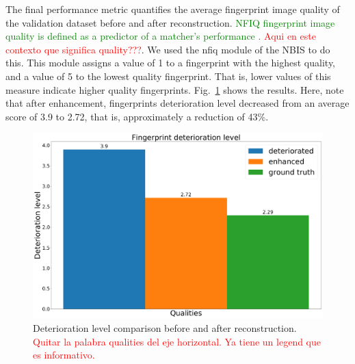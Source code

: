 \documentclass[a4paper,fleqn]{cas-dc}
\begin{document}
The final performance metric quantifies the average fingerprint image quality of the validation dataset before and after reconstruction. \textcolor{green}{NFIQ fingerprint image quality is defined as a predictor of a matcher’s performance \cite{Tabassi2009}.} \textcolor{red}{Aqui en este contexto que significa quality???}. We used the nfiq module of the NBIS to do this. This module assigns a value of 1 to a fingerprint with the highest quality, and a value of 5 to the lowest quality fingerprint. That is, lower values of this measure indicate higher quality fingerprints.  Fig.~\ref{fig11} shows the results. Here, note that after enhancement, fingerprints deterioration level decreased from an average score of 3.9 to 2.72, that is, approximately a reduction of 43\%.
\begin{figure}[htbp]
\centerline{\includegraphics[scale=0.13]{figs/mean_qualities.png}}
\caption{Deterioration level comparison before and after reconstruction. \textcolor{red}{Quitar la palabra qualities del eje horizontal. Ya tiene un legend que es informativo.}}
\label{fig11}
\end{figure}

\end{document}

